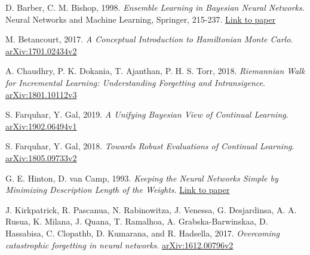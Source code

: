 \documentclass[a4paper,10pt]{article}
\begin{document}




\begin{thebibliography}{8}

 D. Barber, C. M. Bishop, 1998. \textit{Ensemble Learning in Bayesian Neural Networks}. Neural Networks and Machine Learning, Springer, 215-237. \href{https://www.microsoft.com/en-us/research/wp-content/uploads/2016/02/bishop-ensemble-nato-98.pdf}{Link to paper}

 M. Betancourt, 2017. \textit{A Conceptual Introduction to Hamiltonian Monte Carlo}. \href{https://arxiv.org/abs/1701.02434}{arXiv:1701.02434v2}

 A. Chaudhry, P. K. Dokania, T. Ajanthan, P. H. S. Torr, 2018. \textit{Riemannian Walk for Incremental Learning: Understanding Forgetting and Intransigence}. \href{https://arxiv.org/abs/1801.10112}{arXiv:1801.10112v3}

 S. Farquhar, Y. Gal, 2019. \textit{A Unifying Bayesian View of Continual Learning}. \href{https://arxiv.org/abs/1902.06494}{arXiv:1902.06494v1}

 S. Farquhar, Y. Gal, 2018. \textit{Towards Robust Evaluations of Continual Learning}. \href{https://arxiv.org/abs/1805.09733}{arXiv:1805.09733v2}

 G. E. Hinton, D. van Camp, 1993. \textit{Keeping the
Neural Networks Simple by Minimizing Description Length of the Weights}. \href{http://www.cs.toronto.edu/~fritz/absps/colt93.pdf}{Link to paper}

 J. Kirkpatrick, R. Pascanua, N. Rabinowitza, J. Venessa, G. Desjardinsa, A. A. Rusua, K. Milana, J. Quana, T. Ramalhoa, A. Grabska-Barwinskaa, D. Hassabisa, C. Clopathb, D. Kumarana, and R. Hadsella, 2017. \textit{Overcoming catastrophic forgetting in neural networks}. \href{https://arxiv.org/abs/1612.00796}{arXiv:1612.00796v2}


\end{thebibliography}
\end{document}
